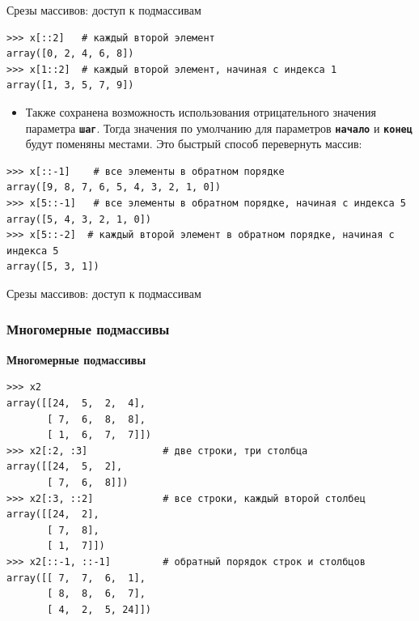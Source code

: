 \documentclass[aspectratio=169, mathserif]{beamer}%
\begin{document}
\begin{frame}[fragile]{Срезы массивов: доступ к подмассивам}
\scriptsize
\begin{verbatim}
>>> x[::2]   # каждый второй элемент
array([0, 2, 4, 6, 8])
>>> x[1::2]  # каждый второй элемент, начиная с индекса 1
array([1, 3, 5, 7, 9])
\end{verbatim}
\begin{itemize}
\item Также сохранена возможность использования отрицательного значения параметра \texttt{\textbf{шаг}}. Тогда значения по умолчанию для параметров \texttt{\textbf{начало}} и \texttt{\textbf{конец}} будут поменяны местами. Это быстрый способ перевернуть массив:
\end{itemize}

\begin{verbatim}
>>> x[::-1]    # все элементы в обратном порядке
array([9, 8, 7, 6, 5, 4, 3, 2, 1, 0])
>>> x[5::-1]   # все элементы в обратном порядке, начиная с индекса 5
array([5, 4, 3, 2, 1, 0])
>>> x[5::-2]  # каждый второй элемент в обратном порядке, начиная с индекса 5
array([5, 3, 1])
\end{verbatim}
\vfill
\end{frame}

\begin{frame}[fragile]{Срезы массивов: доступ к подмассивам}
\scriptsize
\subsubsection{Многомерные подмассивы}
\begin{alertblock}{\textbf{Многомерные подмассивы}}
\begin{verbatim}
>>> x2
array([[24,  5,  2,  4],
       [ 7,  6,  8,  8],
       [ 1,  6,  7,  7]])
>>> x2[:2, :3]             # две строки, три столбца
array([[24,  5,  2],
       [ 7,  6,  8]])
>>> x2[:3, ::2]            # все строки, каждый второй столбец
array([[24,  2],
       [ 7,  8],
       [ 1,  7]])
>>> x2[::-1, ::-1]         # обратный порядок строк и столбцов
array([[ 7,  7,  6,  1],
       [ 8,  8,  6,  7],
       [ 4,  2,  5, 24]])
\end{verbatim}
\end{alertblock}
\vfil
\end{frame}
\end{document}
